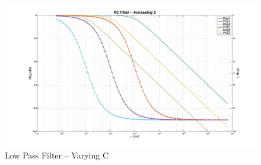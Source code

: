 \begin{figure}[ht!]
\includegraphics[keepaspectratio=true,width=6in]{./figures/parameters/lpFiltVarC.jpg}
\centering
\caption{Low Pass Filter -- Varying C}
\label{fig:lpFiltVarC}
\end{figure}
